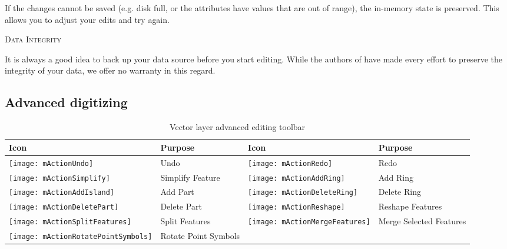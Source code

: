If the changes cannot be saved (e.g. disk full, or the attributes have
values that are out of range), the \qg in-memory state is preserved.  This
allows you to adjust your edits and try again.

\begin{Tip}\caption{\textsc{Data Integrity}}
It is always a good idea to back up your data source before you
start editing. While the authors of \qg have made every effort to preserve the
integrity of your data, we offer no warranty in this regard.
\end{Tip}

\subsection{Advanced digitizing}
\label{sec:advanced_edit}

\begin{table}[h]
\centering
\small
\begin{tabular}{|l|p{6.9cm}|l|p{6.9cm}|}
\hline \textbf{Icon} & \textbf{Purpose} & \textbf{Icon} & \textbf{Purpose} \\
\hline \texttt{[image: mActionUndo]}
   & Undo
   & \texttt{[image: mActionRedo]}
   & Redo \\
\hline \texttt{[image: mActionSimplify]}
   & Simplify Feature
   & \texttt{[image: mActionAddRing]}
   & Add Ring \\
\hline \texttt{[image: mActionAddIsland]}
   & Add Part
   & \texttt{[image: mActionDeleteRing]}
   & Delete Ring \\
\hline \texttt{[image: mActionDeletePart]}
   & Delete Part
   & \texttt{[image: mActionReshape]}
   & Reshape Features \\
\hline \texttt{[image: mActionSplitFeatures]}
   & Split Features
   & \texttt{[image: mActionMergeFeatures]}
   & Merge Selected Features \\
\hline \texttt{[image: mActionRotatePointSymbols]}
   & Rotate Point Symbols
   &
   & \\
\hline
\end{tabular}
\caption{Vector layer advanced editing toolbar}\label{tab:advanced_editing}
\end{table}


